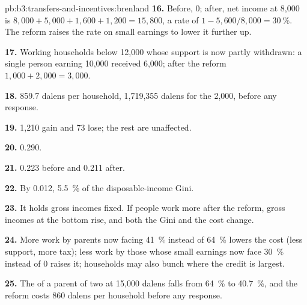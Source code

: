 \begin{solution}{pb:b3:transfers-and-incentives:brenland}
\textbf{16.} Before, 0; after, net income at 8{,}000 is $8{,}000 + 5{,}000 + 1{,}600 + 1{,}200 = 15{,}800$, a rate of
$1 - 5{,}600/8{,}000 = 30~\%$. The reform raises the rate on small earnings to lower it further up.

\textbf{17.} Working households below 12{,}000 whose support is now partly withdrawn:
a single person earning 10{,}000 received 6{,}000; after the reform $1{,}000 + 2{,}000 = 3{,}000$.

\textbf{18.} 859.7 dalens per household, 1{,}719{,}355 dalens for the 2{,}000, before any response.

\textbf{19.} 1{,}210 gain and 73 lose; the rest are unaffected.

\textbf{20.} 0.290.

\textbf{21.} 0.223 before and 0.211 after.

\textbf{22.} By 0.012, 5.5~\% of the disposable-income Gini.

\textbf{23.} It holds gross incomes fixed. If people work more after the reform, gross
incomes at the bottom rise, and both the Gini and the cost change.

\textbf{24.} More work by parents now facing 41~\% instead of 64~\% lowers the cost (less support, more
tax); less work by those whose small earnings now face 30~\% instead of 0 raises it;
households may also bunch where the credit is largest.

\textbf{25.} The  of a parent of two at 15{,}000 dalens falls from 64~\%
to 40.7~\%, and the reform costs 860 dalens per household before any response.
\end{solution}
